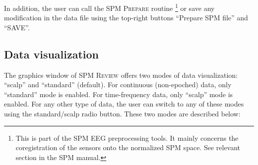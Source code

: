 In addition, the user can call the SPM \textsc{Prepare} routine \footnote{This is part of the SPM EEG preprocessing tools. It mainly concerns the coregistration of the sensors onto the normalized SPM space. See relevant section in the SPM manual.} or save any modification in the data file using the top-right buttons ``Prepare SPM file'' and ``SAVE''.


\subsection{Data visualization}
The graphics window of SPM \textsc{Review} offers two modes of data visualization: ``scalp'' and ``standard'' (default). For continuous (non-epoched) data, only ``standard'' mode is enabled. For time-frequency data, only ``scalp'' mode is enabled. For any other type of data, the user can switch to any of these modes using the standard/scalp radio button.
These two modes are described below:

